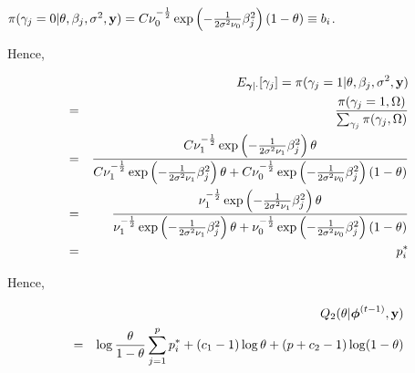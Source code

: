 \documentclass[]{book}
\begin{document}
\(\pi(\gamma_j=0|\theta,\beta_j,\sigma^2,{\bf y})=C \nu_{0}^{-\frac{1}{2}}\exp\left(-\frac{1}{2\sigma^2\nu_{0}}\beta_j^2\right)(1-\theta)\equiv b_i\).

Hence,

\begin{eqnarray*}
            &&E_{{\boldsymbol \gamma}|\cdot}[\gamma_j]=\pi(\gamma_j=1|\theta,\beta_j,\sigma^2,{\bf y})\\
            &=&\frac{\pi(\gamma_j=1,\Omega)}{\sum_{\gamma_j}\pi(\gamma_j,\Omega)}\\
            &=&\frac{C \nu_{1}^{-\frac{1}{2}}\exp\left(-\frac{1}{2\sigma^2\nu_{1}}\beta_j^2\right)\theta}
            {C \nu_{1}^{-\frac{1}{2}}\exp\left(-\frac{1}{2\sigma^2\nu_{1}}\beta_j^2\right)\theta
                +C \nu_{0}^{-\frac{1}{2}}\exp\left(-\frac{1}{2\sigma^2\nu_{0}}\beta_j^2\right)(1-\theta)}\\
            &=&\frac{ \nu_{1}^{-\frac{1}{2}}\exp\left(-\frac{1}{2\sigma^2\nu_{1}}\beta_j^2\right)\theta}
            {\nu_{1}^{-\frac{1}{2}}\exp\left(-\frac{1}{2\sigma^2\nu_{1}}\beta_j^2\right)\theta
                + \nu_{0}^{-\frac{1}{2}}\exp\left(-\frac{1}{2\sigma^2\nu_{0}}\beta_j^2\right)(1-\theta)}\\
            &=&p_i^*
\end{eqnarray*}

Hence,

\begin{eqnarray}
        &&Q_2(\theta|{\boldsymbol \phi}^{(t-1)},{\bf y})\nonumber\\
        &=& \log \frac{\theta}{1-\theta} \sum_{j=1}^{p}p_i^*+
        (c_1-1)\log\theta + (p+c_2-1)\log(1-\theta)
        \label{eq:q2}
\end{eqnarray}
\end{document}
